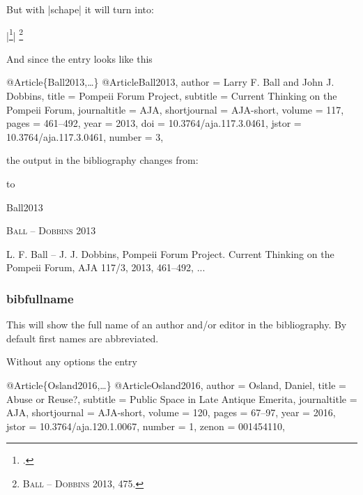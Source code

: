 \documentclass[a4paper,
10pt,
greek,
french,
spanish,
italian,
ngerman,
english,
]{ltxdoc}
\begin{document}
But with |schape| it will turn into:

\begin{tcolorbox}[examplebox] 
|\footnote{\cite[475]{Ball2013}.}|
\tcblower
\footnote{{\scshape {\color{red}Ball – Dobbins}} 2013, 475.}
\end{tcolorbox}

And since the entry looks like this

\begin{bibexample}[label=Ball2013]{{@}Article\{Ball2013,…\}}
@Article{Ball2013,
author       = {Larry F. Ball and John J. Dobbins},
title        = {Pompeii Forum Project},
subtitle     = {Current Thinking on the Pompeii Forum},
journaltitle = AJA,
shortjournal = AJA-short,
volume       = {117},
pages        = {461--492},
year         = {2013},
doi          = {10.3764/aja.117.3.0461},
jstor       = {10.3764/aja.117.3.0461},
number       = {3},
}
\end{bibexample}


the output in the bibliography changes from:


to 

\begin{bibbox}{Ball2013}\footnotesize
\parbox[t]{3cm}{{\scshape \color{red}Ball – Dobbins} 2013}\parbox[t]{8.5cm}{%
L. F. Ball – J. J. Dobbins, Pompeii Forum Project. Current Thinking on the Pompeii Forum, AJA 117/3, 2013, 461–492,\newline
...}
\end{bibbox}

\subsubsection{bibfullname}\label{bibfullname}
This will show the full name of an author and/or editor in the bibliography. 
By default first names are abbreviated.

Without any options the entry

\begin{bibexample}[label=Osland2016]{{@}Article\{Osland2016,…\}}
@Article{Osland2016,
  author       = {Osland, Daniel},
  title        = {Abuse or Reuse?},
  subtitle     = {Public Space in Late Antique Emerita},
  journaltitle = AJA,
  shortjournal = AJA-short,
  volume       = {120},
  pages        = {67--97},
  year         = {2016},
  jstor        = {10.3764/aja.120.1.0067},
  number       = {1},
  zenon        = {001454110},
}
\end{bibexample}
\end{document}
